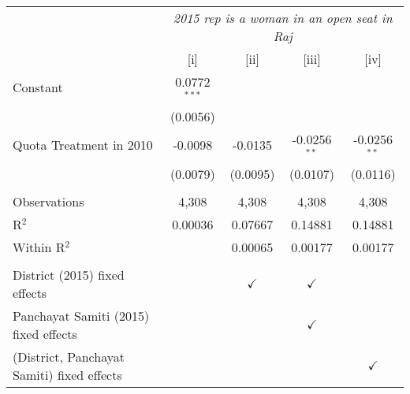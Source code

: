 
\begingroup
\centering
\begin{tabular}{lcccc}
   \toprule
    & \multicolumn{4}{c}{\textit{2015 rep is a woman in an open seat in Raj}}\\
                                              & [i]            & [ii]          & [iii]          & [iv]\\  
   \midrule 
   Constant                                   & 0.0772$^{***}$ &               &                &   \\   
                                              & (0.0056)       &               &                &   \\   
   Quota Treatment in 2010                    & -0.0098        & -0.0135       & -0.0256$^{**}$ & -0.0256$^{**}$\\   
                                              & (0.0079)       & (0.0095)      & (0.0107)       & (0.0116)\\   
    \\
   Observations                               & 4,308          & 4,308         & 4,308          & 4,308\\  
   R$^2$                                      & 0.00036        & 0.07667       & 0.14881        & 0.14881\\  
   Within R$^2$                               &                & 0.00065       & 0.00177        & 0.00177\\  
    \\
   District (2015) fixed effects              &                & $\checkmark$  & $\checkmark$   & \\  
   Panchayat Samiti (2015) fixed effects      &                &               & $\checkmark$   & \\  
   (District, Panchayat Samiti) fixed effects &                &               &                & $\checkmark$\\   
   \bottomrule
\end{tabular}
\par\endgroup


